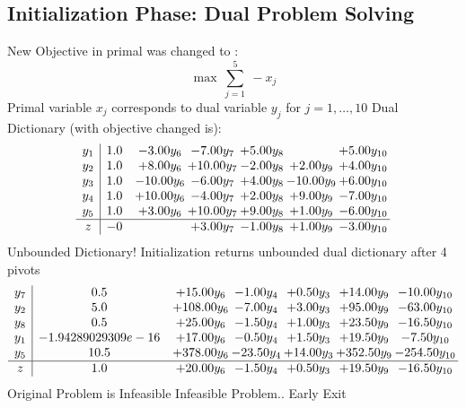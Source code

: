 \documentclass[9pt]{article}
\begin{document}
\subsection{Initialization Phase: Dual Problem Solving}
New Objective in primal was changed to : \[ \max\ \sum_{j=1}^{5}\ - x_j \] 
Primal variable $x_j$ corresponds to dual variable $y_j$ for $j = 1,\ldots,10$
Dual Dictionary (with objective changed is): 
\[\begin{array}{c| c c@{\hskip 2pt} c@{\hskip 2pt} c@{\hskip 2pt} c@{\hskip 2pt} c@{\hskip 2pt} }
 y_{1}   &  1.0 & -3.00 y_{6} & -7.00 y_{7} & +  5.00 y_{8} &   & +  5.00 y_{10}\\
 y_{2}   &  1.0 & +  8.00 y_{6} & + 10.00 y_{7} & -2.00 y_{8} & +  2.00 y_{9} & +  4.00 y_{10}\\
 y_{3}   &  1.0 & -10.00 y_{6} & -6.00 y_{7} & +  4.00 y_{8} & -10.00 y_{9} & +  6.00 y_{10}\\
 y_{4}   &  1.0 & + 10.00 y_{6} & -4.00 y_{7} & +  2.00 y_{8} & +  9.00 y_{9} & -7.00 y_{10}\\
 y_{5}   &  1.0 & +  3.00 y_{6} & + 10.00 y_{7} & +  9.00 y_{8} & +  1.00 y_{9} & -6.00 y_{10}\\
\hline
z    &  -0  &   & +  3.00 y_{7} & -1.00 y_{8} & +  1.00 y_{9} & -3.00 y_{10}\\
\end{array}\]
Unbounded Dictionary!
Initialization returns unbounded dual dictionary after 4 pivots
\[\begin{array}{c| c c@{\hskip 2pt} c@{\hskip 2pt} c@{\hskip 2pt} c@{\hskip 2pt} c@{\hskip 2pt} }
 y_{7}   &  0.5 & + 15.00 y_{6} & -1.00 y_{4} & +  0.50 y_{3} & + 14.00 y_{9} & -10.00 y_{10}\\
 y_{2}   &  5.0 & + 108.00 y_{6} & -7.00 y_{4} & +  3.00 y_{3} & + 95.00 y_{9} & -63.00 y_{10}\\
 y_{8}   &  0.5 & + 25.00 y_{6} & -1.50 y_{4} & +  1.00 y_{3} & + 23.50 y_{9} & -16.50 y_{10}\\
 y_{1}   &  -1.94289029309e-16 & + 17.00 y_{6} & -0.50 y_{4} & +  1.50 y_{3} & + 19.50 y_{9} & -7.50 y_{10}\\
 y_{5}   &  10.5 & + 378.00 y_{6} & -23.50 y_{4} & + 14.00 y_{3} & + 352.50 y_{9} & -254.50 y_{10}\\
\hline
z    &  1.0 & + 20.00 y_{6} & -1.50 y_{4} & +  0.50 y_{3} & + 19.50 y_{9} & -16.50 y_{10}\\
\end{array}\]
Original Problem is Infeasible
Infeasible Problem.. Early Exit
\end{document}
